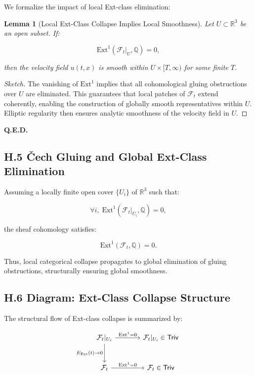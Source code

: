 \documentclass[11pt]{article}
\newtheorem{lemma}[theorem]{Lemma}
\begin{document}
We formalize the impact of local Ext-class elimination:

\begin{lemma}[Local Ext-Class Collapse Implies Local Smoothness]
Let \( U \subset \mathbb{R}^3 \) be an open subset.  
If:

\[
\mathrm{Ext}^1(\mathcal{F}_t|_U, \mathbb{Q}) = 0,
\]

then the velocity field \( u(t, x) \) is smooth within \( U \times [T, \infty) \) for some finite \( T \).
\end{lemma}

\begin{proof}[Sketch]
The vanishing of \( \mathrm{Ext}^1 \) implies that all cohomological gluing obstructions over \( U \) are eliminated.  
This guarantees that local patches of \( \mathcal{F}_t \) extend coherently, enabling the construction of globally smooth representatives within \( U \).  
Elliptic regularity then ensures analytic smoothness of the velocity field in \( U \).
\end{proof}

\begin{flushright}
\textbf{Q.E.D.}
\end{flushright}

\subsection*{H.5 Čech Gluing and Global Ext-Class Elimination}

Assuming a locally finite open cover \( \{ U_i \} \) of \( \mathbb{R}^3 \) such that:

\[
\forall i, \; \mathrm{Ext}^1(\mathcal{F}_t|_{U_i}, \mathbb{Q}) = 0,
\]

the sheaf cohomology satisfies:

\[
\mathrm{Ext}^1(\mathcal{F}_t, \mathbb{Q}) = 0.
\]

Thus, local categorical collapse propagates to global elimination of gluing obstructions, structurally ensuring global smoothness.

\subsection*{H.6 Diagram: Ext-Class Collapse Structure}

The structural flow of Ext-class collapse is summarized by:

\[
\begin{tikzcd}[row sep=large, column sep=large]
\mathcal{F}_t|_{U_i}
  \arrow[r, "{\mathrm{Ext}^1 = 0}"]
  \arrow[d, "{E_{\mathrm{Ext}}(t) \to 0}"']
& \mathcal{F}_t|_{U_i} \in \mathsf{Triv} \\
\mathcal{F}_t
  \arrow[r, "{\mathrm{Ext}^1 = 0}"]
& \mathcal{F}_t \in \mathsf{Triv}
\end{tikzcd}
\]
\end{document}
